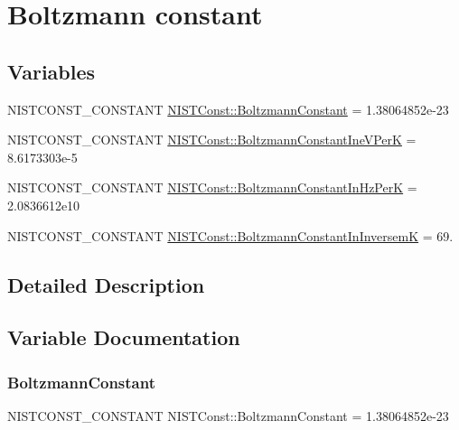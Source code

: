 \hypertarget{group___n_i_s_t_const-_boltzmann_constant}{}\section{Boltzmann constant}
\label{group___n_i_s_t_const-_boltzmann_constant}
\subsection*{Variables}
\begin{DoxyCompactItemize}
\item 
N\+I\+S\+T\+C\+O\+N\+S\+T\+\_\+\+C\+O\+N\+S\+T\+A\+NT \mbox{\hyperlink{group___n_i_s_t_const-_boltzmann_constant_ga9a66c4988ef0f1d8298d0f43ccea6f1f}{N\+I\+S\+T\+Const\+::\+Boltzmann\+Constant}} = 1.\+38064852e-\/23
\item 
N\+I\+S\+T\+C\+O\+N\+S\+T\+\_\+\+C\+O\+N\+S\+T\+A\+NT \mbox{\hyperlink{group___n_i_s_t_const-_boltzmann_constant_ga8c0cb1b4b0d54e1a5bf735efaef8d349}{N\+I\+S\+T\+Const\+::\+Boltzmann\+Constant\+Ine\+V\+PerK}} = 8.\+6173303e-\/5
\item 
N\+I\+S\+T\+C\+O\+N\+S\+T\+\_\+\+C\+O\+N\+S\+T\+A\+NT \mbox{\hyperlink{group___n_i_s_t_const-_boltzmann_constant_gae7c3bd9c33c056465e2fe1e8e6f5bbd2}{N\+I\+S\+T\+Const\+::\+Boltzmann\+Constant\+In\+Hz\+PerK}} = 2.\+0836612e10
\item 
N\+I\+S\+T\+C\+O\+N\+S\+T\+\_\+\+C\+O\+N\+S\+T\+A\+NT \mbox{\hyperlink{group___n_i_s_t_const-_boltzmann_constant_ga03a6526c1016d67e765abded43b37f36}{N\+I\+S\+T\+Const\+::\+Boltzmann\+Constant\+In\+InversemK}} = 69.
\end{DoxyCompactItemize}


\subsection{Detailed Description}


\subsection{Variable Documentation}
\mbox{\label{group___n_i_s_t_const-_boltzmann_constant_ga9a66c4988ef0f1d8298d0f43ccea6f1f}} 
\subsubsection{\texorpdfstring{Boltzmann\+Constant}{BoltzmannConstant}}
{\footnotesize\ttfamily N\+I\+S\+T\+C\+O\+N\+S\+T\+\_\+\+C\+O\+N\+S\+T\+A\+NT N\+I\+S\+T\+Const\+::\+Boltzmann\+Constant = 1.\+38064852e-\/23}

